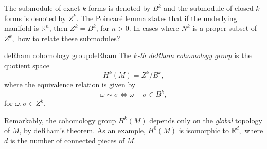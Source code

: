 The submodule of exact \(k\)-forms is denoted by \(B^k\) and the submodule of closed \(k\)-forms is denoted by \(Z^k.\) The Poincaré lemma states that if the underlying manifold is \(\mathbb{R}^n\), then \(Z^k = B^k\), for \(n > 0.\) In cases where \(N^k\) is a proper subset of \(Z^k,\) how to relate these submodules?

\begin{definition}{deRham cohomology group}{deRham}
    The \emph{\(k\)-th deRham cohomology group} is the quotient space
    \begin{equation*}
        H^k(M) = Z^k/B^k,
    \end{equation*}
    where the equivalence relation is given by
    \begin{equation*}
        \omega \sim \sigma \iff \omega - \sigma \in B^k,
    \end{equation*}
    for \(\omega,\sigma \in Z^k.\)
\end{definition}

Remarkably, the cohomology group \(H^k(M)\) depends only on the \emph{global} topology of \(M\), by deRham's theorem. As an example, \(H^0(M)\) is isomorphic to \(\mathbb{R}^d,\) where \(d\) is the number of connected pieces of \(M.\)
